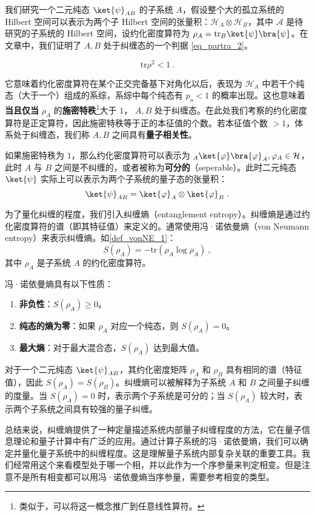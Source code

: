 

我们研究一个二元纯态 $\ket{\psi}_{AB}$ 的子系统 $A$，假设整个大的孤立系统的 Hilbert 空间可以表示为两个子 Hilbert 空间的张量积：$\mathcal{H}_A\otimes \mathcal{H}_B$，其中 $\mathcal A$ 是待研究的子系统的 Hilbert 空间，设约化密度算符为 $\rho_A=\text{tr}_B \ket{\psi}\bra{\psi}$。在文章中，我们证明了 $A,B$ 处于纠缠态的一个判据 \autoref{eq_partra_2}。

\begin{equation}
\text{tr} \rho^2 <1~.
\end{equation}

它意味着约化密度算符在某个正交完备基下对角化以后，表现为 $\mathcal{H}_A$ 中若干个纯态（大于一个）组成的系综，系综中每个纯态有 $p_a<1$ 的概率出现。这也意味着\textbf{当且仅当} $\rho_A$ 的\textbf{施密特秩}\footnote{类似于，可以将这一概念推广到任意线性算符。}大于 $1$， $A,B$ 处于纠缠态。在此处我们考察的约化密度算符是正定算符，因此施密特秩等于正的本征值的个数。若本征值个数 $>1$，体系处于纠缠态，我们称 $A,B$ 之间具有\textbf{量子相关性}。

如果施密特秩为 $1$，那么约化密度算符可以表示为 ${}_A\ket{\varphi}\bra{\varphi}_A,\varphi_A\in \mathcal{H}$，此时 $A$ 与 $B$ 之间是不纠缠的，或者被称为\textbf{可分的}（seperable）。此时二元纯态 $\ket{\psi}$ 实际上可以表示为两个子系统的量子态的张量积：
\begin{equation}
\ket{\psi}_{AB}=\ket{\varphi}_A\otimes \ket{\varphi}_B~.
\end{equation}

为了量化纠缠的程度，我们引入纠缠熵（entanglement entropy）。纠缠熵是通过约化密度算符的谱（即其特征值）来定义的。通常使用冯·诺依曼熵（von Neumann entropy）来表示纠缠熵。如\autoref{def_vonNE_1}：
\begin{equation}
S(\rho_A) = - \text{tr}(\rho_A \log \rho_A)~,
\end{equation}
其中 $\rho_A$ 是子系统 $A$ 的约化密度算符。

冯·诺依曼熵具有以下性质：
\begin{enumerate}
    \item \textbf{非负性}：$S(\rho_A) \geq 0$。
    \item \textbf{纯态的熵为零}：如果 $\rho_A$ 对应一个纯态，则 $S(\rho_A) = 0$。
    \item \textbf{最大熵}：对于最大混合态，$S(\rho_A)$ 达到最大值。
\end{enumerate}
对于一个二元纯态 $\ket{\psi}_{AB}$，其约化密度矩阵 $\rho_A$ 和 $\rho_B$ 具有相同的谱（特征值），因此 $S(\rho_A) = S(\rho_B)$。纠缠熵可以被解释为子系统 $A$ 和 $B$ 之间量子纠缠的度量。当 $S(\rho_A) = 0$ 时，表示两个子系统是可分的；当 $S(\rho_A)$ 较大时，表示两个子系统之间具有较强的量子纠缠。

总结来说，纠缠熵提供了一种定量描述系统内部量子纠缠程度的方法，它在量子信息理论和量子计算中有广泛的应用。通过计算子系统的冯·诺依曼熵，我们可以确定并量化量子系统中的纠缠程度。这是理解量子系统内部复杂关联的重要工具。我们经常用这个来看模型处于哪一个相，并以此作为一个序参量来判定相变。但是注意不是所有相变都可以用冯·诺依曼熵当序参量，需要参考相变的类型。

